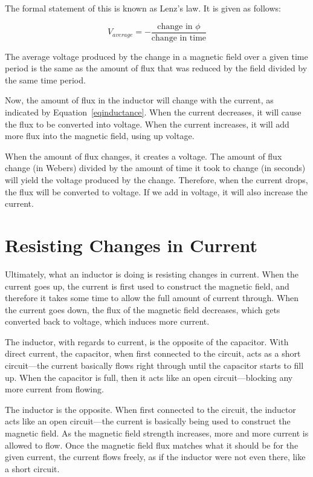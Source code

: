 The formal statement of this is known as Lenz's law.  It is given as follows:

\begin{equation}
\label{eqlenz}
V_{average} = -\frac{\textrm{change in }\phi}{\textrm{change in time}}
\end{equation}

The average voltage produced by the change in a magnetic field over a given time period is the same as the amount of flux that was reduced by the field divided by the same time period.

Now, the amount of flux in the inductor will change with the current, as indicated by Equation~\ref{eqinductance}.
When the current decreases, it will cause the flux to be converted into voltage.
When the current increases, it will add more flux into the magnetic field, using up voltage.

When the amount of flux changes, it creates a voltage.
The amount of flux change (in Webers) divided by the amount of time it took to change (in seconds) will yield the voltage produced by the change.
Therefore, when the current drops, the flux will be converted to voltage.
If we add in voltage, it will also increase the current.

\section{Resisting Changes in Current}

Ultimately, what an inductor is doing is resisting changes in current.
When the current goes up, the current is first used to construct the magnetic field, and therefore it takes some time to allow the full amount of current through.
When the current goes down, the flux of the magnetic field decreases, which gets converted back to voltage, which induces more current.

The inductor, with regards to current, is the opposite of the capacitor.
With direct current, the capacitor, when first connected to the circuit, acts as a short circuit---the current basically flows right through until the capacitor starts to fill up.
When the capacitor is full, then it acts like an open circuit---blocking any more current from flowing.

The inductor is the opposite.
When first connected to the circuit, the inductor acts like an open circuit---the current is basically being used to construct the magnetic field.
As the magnetic field strength increases, more and more current is allowed to flow.
Once the magnetic field flux matches what it should be for the given current, the current flows freely, as if the inductor were not even there, like a short circuit.

